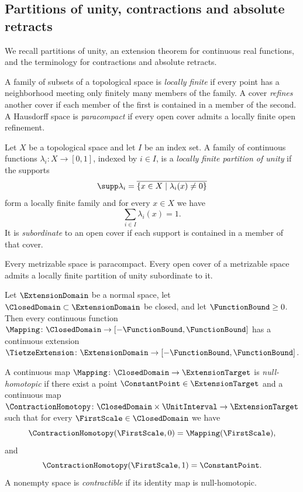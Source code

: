\subsection{Partitions of unity, contractions and absolute retracts}\label{subsec:preliminaries-topology}
We recall partitions of unity,
an extension theorem for continuous real functions,
and the terminology for contractions and absolute retracts.

A family of subsets of a topological space is \emph{locally finite} if every point
has a neighborhood meeting only finitely many members of the family.
A cover \emph{refines} another cover if each member of the first is contained
in a member of the second.
A Hausdorff space is \emph{paracompact} if every open cover admits a locally finite
open refinement.

Let
$X$
be a topological space and let
$I$
be an index set.
A family of continuous functions
$\lambda_i\colon X\to[0,1]$,
indexed by
$i\in I$,
is a \emph{locally finite partition of unity} if the supports
\[
 \supp\lambda_i=\overline{\{x\in X\mid\lambda_i(x)\ne0\}}
\]
form a locally finite family and for every
$x\in X$
we have
\[
 \sum_{i\in I}\lambda_i(x)=1.
\]
It is \emph{subordinate} to an open cover if each support is contained in a member
of that cover.

\begin{theorem}\label{thm:metric-partition-unity}
Every metrizable space is paracompact.
Every open cover of a metrizable space admits a locally finite partition of unity
subordinate to it.
\end{theorem}

\begin{theorem}\label{thm:tietze}
Let
$\ExtensionDomain$
be a normal space,
let
$\ClosedDomain\subset\ExtensionDomain$
be closed,
and let
$\FunctionBound\geq0$.
Then every continuous function
$\Mapping\colon\ClosedDomain\to[-\FunctionBound,\FunctionBound]$
has a continuous extension
$\TietzeExtension\colon\ExtensionDomain\to[-\FunctionBound,\FunctionBound]$.
\end{theorem}

A continuous map
$\Mapping \colon \ClosedDomain \to \ExtensionTarget $
is \emph{null-homotopic} if there exist a point
$\ConstantPoint \in \ExtensionTarget $
and a continuous map
$\ContractionHomotopy \colon \ClosedDomain \times\UnitInterval\to \ExtensionTarget $
such that for every
$\FirstScale\in\ClosedDomain$
we have
\[
 \ContractionHomotopy (\FirstScale ,0)=\Mapping (\FirstScale ),
\]
and
\[
 \ContractionHomotopy (\FirstScale ,1)=\ConstantPoint.
\]
A nonempty space is \emph{contractible} if its identity map is null-homotopic.

